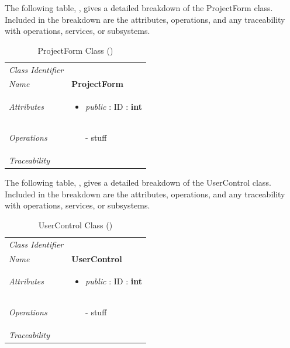 \documentclass[12pt,letterpaper]{article}
\begin{document}
The following table, , gives a detailed breakdown of the ProjectForm class. Included in the breakdown are the attributes, operations, and any traceability with operations, services, or subsystems.

\begin{table}[H]
    \caption{ProjectForm Class ()} 
	\begin{tabu} to 
		\toprule
		Class Identifier &  \\
		Name & {\bf ProjectForm} \\
		Attributes & 
		\begin{minipage}[t]{\linewidth}
		    \begin{itemize}
		        \item \textit{public} : ID : \bf{int}
			\end{itemize}
	    \end{minipage} \\

		Operations &
		\begin{minipage}[t]{\linewidth}
			\begin{enumerate}
			    \item[-] stuff
	        \end{enumerate}
	    \end{minipage} \\
	    	Traceability & \\
		\toprule
	\end{tabu}
\end{table}

The following table, , gives a detailed breakdown of the UserControl class. Included in the breakdown are the attributes, operations, and any traceability with operations, services, or subsystems.

\begin{table}[H]
    \caption{UserControl Class ()} 
	\begin{tabu} to 
		\toprule
		Class Identifier &  \\
		Name & {\bf UserControl} \\
		Attributes & 
		\begin{minipage}[t]{\linewidth}
		    \begin{itemize}
		        \item \textit{public} : ID : \bf{int}
			\end{itemize}
	    \end{minipage} \\

		Operations &
		\begin{minipage}[t]{\linewidth}
			\begin{enumerate}
			    \item[-] stuff
	        \end{enumerate}
	    \end{minipage} \\
	    	Traceability & \\
		\toprule
	\end{tabu}
\end{table}
\end{document}
